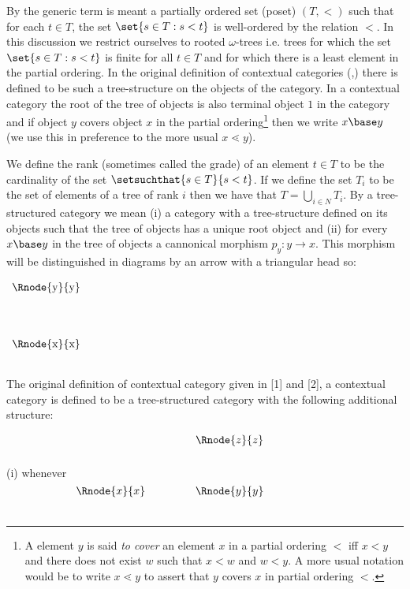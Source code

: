 
\note 
By  the generic term  is meant a partially ordered set (poset) $(T, <)$ such that for each $t \in T$, the set $\set{s \in T : s < t}$ is well-ordered by the relation $<$.
In this discussion we restrict ourselves to rooted $\omega$-trees i.e. trees for which the set $\set{s \in T : s < t}$
is finite for all $t \in T$ and for which there is a least element in the partial ordering. 
In the original definition
of contextual categories (\cite{Cartmell78,Cartmell86},) there is defined to be such a tree-structure on the objects of the category. In a contextual category the root of the tree of objects is also  terminal object $1$
in the category and if object $y$ covers object $x$ in the partial ordering\footnote{A element $y$ is said \textit{to cover} 
an element $x$ in a partial ordering $<$ iff $x<y$ and there does not exist $w$ such that $x < w$ and $w < y$.
A more usual notation would be to write $x \lessdot y$ to assert that $y$ covers $x$ in partial ordering $<$. }
then we write $x \base y$ (we use this in preference to the more usual $x \lessdot y$). 

We define the rank (sometimes called the grade) of an element $t \in T$ to be the cardinality
of the set $\setsuchthat{s \in T}{s < t}$. If we define the set $T_i$ to be the set of elements of a tree
of rank $i$ then we have that $T= \bigcup_{i \in N}T_i$. 
\note
By a tree-structured category we mean (i) a category with a tree-structure defined on its objects such that the tree of objects has a unique root object and (ii) for every $x \base y$ in the tree of objects  a cannonical morphism $p_y:y \rightarrow x$. This morphism will be distinguished in diagrams by an arrow with  a triangular head so:

\begin{center}
$
\begin{array}{p{2cm}p{0.5cm}p{0.5cm}p{0.5cm}}
\Rnode{y}{y}& \\ [1.4cm]
\Rnode{x}{x} \\
\end{array}
$
\end{center}
\note
The original definition of contextual category given  in [1] and [2], a contextual category is defined to be a tree-structured category 
 with the following additional structure:

\noindent 
(i) whenever
$
\begin{array}{cp{.9cm}c}
            & & \Rnode{z}{z} \\ [1.2cm]
\Rnode{x}{x}& & \Rnode{y}{y} \\ [0.5cm]
\end{array}
$


